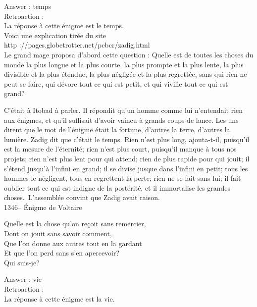 ﻿\documentclass[letterpaper, 12pt]{article}
\begin{document}
Answer : temps\\

Retroaction : \\
La r\'eponse \`a cette \'enigme est le temps.  \\
Voici une explication tir\'ee du site\\
http ://pages.globetrotter.net/pcbcr/zadig.html\\

Le grand mage proposa d'abord cette question : \og Quelle est de
toutes les choses du monde la plus longue et la plus courte, la plus
prompte et la plus lente, la plus divisible et la plus \'etendue, la
plus n\'eglig\'ee et la plus regrett\'ee, sans qui rien ne peut se
faire, qui d\'evore tout ce qui est petit, et qui vivifie tout ce
qui est grand?\fg\

C'\'etait \`a Itobad \`a parler. Il r\'epondit qu'un homme comme lui
n'entendait rien aux \'enigmes, et qu'il suffisait d'avoir vaincu
\`a grands coups de lance. Les uns dirent que le mot de l'\'enigme
\'etait la fortune, d'autres la terre, d'autres la lumi\`ere. Zadig
dit que c'\'etait le temps. \og Rien n'est plus long, ajouta-t-il,
puisqu'il est la mesure de l'\'eternit\'e; rien n'est plus court,
puisqu'il manque \`a tous nos projets; rien n'est plus lent pour qui
attend; rien de plus rapide pour qui jouit; il s'\'etend jusqu'\`a
l'infini en grand; il se divise jusque dans l'infini en petit; tous
les hommes le n\'egligent, tous en regrettent la perte; rien ne se
fait sans lui; il fait oublier tout ce qui est indigne de la
post\'erit\'e, et il immortalise les grandes choses.\fg\
L'assembl\'ee convint que Zadig avait raison.\\


1346-- \'Enigme de Voltaire\\
\begin{center}{Quelle est la chose qu'on re\c coit sans remercier, \\
Dont on jouit sans savoir comment,\\
Que l'on donne aux autres tout en la gardant\\
Et que l'on perd sans s'en apercevoir?\\
Qui suis-je?\\}
\end{center}

Answer : vie\\

Retroaction : \\
La r\'eponse \`a cette \'enigme est la vie.\\
\end{document}
